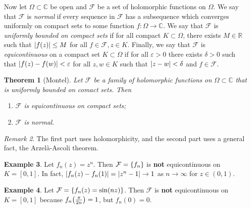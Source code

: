 \documentclass[leqno, openany]{memoir}
\newtheorem{thm}{Theorem}[section]
\theoremstyle{definition}
\newtheorem{exm}[thm]{Example}
\theoremstyle{remark}
\newtheorem{rmk}[thm]{Remark}
\theoremstyle{plain}
\theoremstyle{definition}
\theoremstyle{remark}
\newcommand{\R}{\mathbb{R}}
\newcommand{\C}{\mathbb{C}}
\newcommand{\ep}{\varepsilon}
\newcommand{\mc}[1]{\mathcal{#1}}
\begin{document}
Now let $\Omega \subset \C$ be open and $\mc{F}$ be a set of holomorphic functions on $\Omega$. We say that $\mc{F}$ is \textit{normal} if every sequence in $\mc{F}$ has a subsequence which converges uniformly on compact sets to some function $f \colon \Omega \to \C$. We say that $\mc{F}$ is \textit{uniformly bounded on compact sets} if for all compact $K \subset \Omega$, there exists $M \in \R$ such that $\abs{f(z)} \leq M$ for all $f \in \mc{F}, z \in K$. Finally, we say that $\mc{F}$ is \textit{equicontinuous} on a compact set $K \subset \Omega$ if for all $\ep > 0$ there exists $\delta > 0$ such that $\abs{f(z) - f(w)} < \ep$ for all $z,w \in K$ such that $\abs{z - w} < \delta$ and $f \in \mc{F}$.

\begin{thm}[Montel]
    Let $\mc{F}$ be a family of holomorphic functions on $\Omega \subset \C$ that is uniformly bounded on comact sets. Then
    \begin{enumerate}
        \item $\mc{F}$ is equicontinuous on compact sets;
        \item $\mc{F}$ is normal.
    \end{enumerate}
\end{thm}

\begin{rmk}
    The first part uses holomorphicity, and the second part uses a general fact, the Arzel\`a-Ascoli theorem.
\end{rmk}

\begin{exm}
    Let $f_n(z) = z^n$. Then $\mc{F} = \qty{f_n}$ is \textbf{not} equicontinuous on $K = [0,1]$. In fact, $\abs{f_n(z) - f_n(1)} = \abs{z^n - 1} \to 1$ as $n \to \infty$ for $z \in (0,1)$.
\end{exm}

\begin{exm}
    Let $\mc{F} = \qty{f_n(z) = \sin(nz)}$. Then $\mc{F}$ is \textbf{not} equicontinuous on $K = [0,1]$ because $f_n\qty(\frac{\pi}{2n}) = 1$, but $f_n(0) = 0$.
\end{exm}
\end{document}
